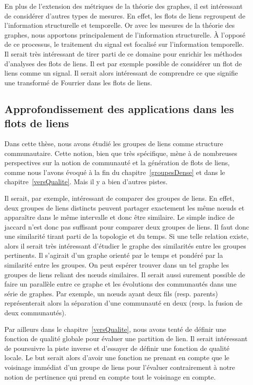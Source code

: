 En plus de l'extension des métriques de la théorie  des graphes, il est intéressant de considérer d'autres types de mesures.
En effet, les flots de liens regroupent de l'information structurelle et temporelle.
Or avec les mesures de la théorie des graphes, nous apportons principalement de l'information structurelle.
\`A l'opposé de ce processus, le traitement du signal est focalisé sur l'information temporelle.
Il serait très intéressant de tirer parti de ce domaine pour enrichir les méthodes d'analyses des flots de liens.
Il est par exemple possible de considérer un flot de liens comme un signal.
Il serait alors intéressant de comprendre ce que signifie une transformé de Fourrier dans les flots de liens.

\subsection{Approfondissement des applications dans les flots de liens}
Dans cette thèse, nous avons étudié les groupes de liens comme structure communautaire.
Cette notion, bien que très spécifique, mène à de nombreuses perspectives sur la notion de communauté et la génération de flots de liens, comme nous l'avons évoqué à la fin du chapitre~\ref{groupesDense} et dans le chapitre~\ref{versQualite}.
Mais il y a bien d'autres pistes.

Il serait, par exemple, intéressant de comparer des groupes de liens.
En effet, deux groupes de liens distincts peuvent partager exactement les même n\oe uds et apparaître dans le même intervalle et donc être similaire.
Le simple indice de jaccard n'est donc pas suffisant pour comparer deux groupes de liens.
Il faut donc une similarité tirant parti de la topologie et du temps.
Si une telle relation existe, alors il serait très intéressant d'étudier le graphe des similarités entre les groupes pertinents.
Il s'agirait d'un graphe orienté par le temps et pondéré par la similarité entre les groupes.
On peut espérer trouver dans un tel graphe les groupes de liens reliant des n\oe uds similaires.
Il serait aussi surement possible de faire un parallèle entre ce graphe et les évolutions des communautés dans une série de graphes.
Par exemple, un n\oe uds ayant deux fils (resp. parents) représenterait alors la séparation d'une communauté en deux (resp. la fusion de deux communautés).

Par ailleurs dans le chapitre~\ref{versQualite}, nous avons tenté de définir une fonction de qualité globale pour évaluer une partition de lien.
Il serait intéressant de poursuivre la piste inverse et d'essayer de définir une fonction de qualité locale.
Le but serait alors d'avoir une fonction ne prenant en compte que le voisinage immédiat d'un groupe de liens pour l'évaluer contrairement à notre notion de pertinence qui prend en compte tout le voisinage en compte.

